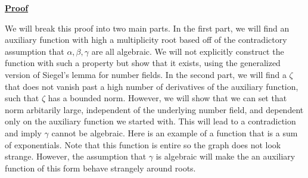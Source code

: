 \documentclass[a4paper, 11pt]{book}
\newcommand{\proof}{\underline{\textbf{Proof}} }
\begin{document}
\proof{We will break this proof into two main parts. In the first part, we will find an auxiliary function with high a multiplicity root based off of the contradictory assumption that $\alpha, \beta, \gamma$ are all algebraic. We will not explicitly construct the function with such a property but show that it exists, using the generalized version of Siegel's lemma for number fields. In the second part, we will find a $\zeta$ that does not vanish past a high number of derivatives of the auxiliary function, such that $\zeta$ has a bounded norm. However, we will show that we can set that norm arbitarily large, independent of the underlying number field, and dependent only on the auxiliary function we started with. This will lead to a contradiction and imply $\gamma$ cannot be algebraic. Here is an example of a function that is a sum of exponentials. Note that this function is entire so the graph does not look strange. However, the assumption that $\gamma$ is algebraic will make the an auxiliary function of this form behave strangely around roots.

    \begin{center} 
\end{center}
\newpage
}
\end{document}

